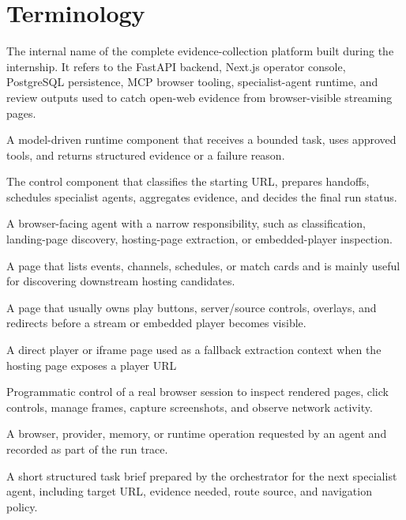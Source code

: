 \chapter*{Terminology}

\begingroup
\small
\raggedright
\begin{description}[leftmargin=4.55cm,labelwidth=4.15cm,labelsep=0.4cm,style=sameline,itemsep=0.34em,topsep=0.35em,parsep=0pt]
  \item[Open Web Catcher (OWC)] The internal name of the complete evidence-collection platform built during the internship. It refers to the FastAPI backend, Next.js operator console, PostgreSQL persistence, MCP browser tooling, specialist-agent runtime, and review outputs used to catch open-web evidence from browser-visible streaming pages.
  \item[Agent] A model-driven runtime component that receives a bounded task, uses approved tools, and returns structured evidence or a failure reason.
  \item[Orchestrator] The control component that classifies the starting URL, prepares handoffs, schedules specialist agents, aggregates evidence, and decides the final run status.
  \item[Specialist agent] A browser-facing agent with a narrow responsibility, such as classification, landing-page discovery, hosting-page extraction, or embedded-player inspection.
  \item[Landing page] A page that lists events, channels, schedules, or match cards and is mainly useful for discovering downstream hosting candidates.
  \item[Hosting page] A page that usually owns play buttons, server/source controls, overlays, and redirects before a stream or embedded player becomes visible.
  \item[Embedded page] A direct player or iframe page used as a fallback extraction context when the hosting page exposes a player URL
  \item[Browser automation] Programmatic control of a real browser session to inspect rendered pages, click controls, manage frames, capture screenshots, and observe network activity.
  \item[Tool call] A browser, provider, memory, or runtime operation requested by an agent and recorded as part of the run trace.
  \item[Handoff] A short structured task brief prepared by the orchestrator for the next specialist agent, including target URL, evidence needed, route source, and navigation policy.

\end{description}
